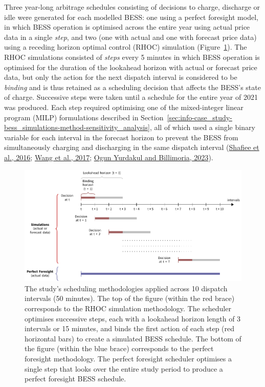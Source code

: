\documentclass[12pt,a4paper,]{report}
\begin{document}
Three year-long arbitrage schedules consisting of decisions to charge,
discharge or idle were generated for each modelled BESS: one using a
perfect foresight model, in which BESS operation is optimised across the
entire year using actual price data in a single \emph{step}, and two
(one with actual and one with forecast price data) using a receding
horizon optimal control (RHOC) simulation
(Figure~\ref{fig:bess_schedules}). The RHOC simulations consisted of
\emph{steps} every 5 minutes in which BESS operation is optimised for
the duration of the lookahead horizon with actual or forecast price
data, but only the action for the next dispatch interval is considered
to be \emph{binding} and is thus retained as a scheduling decision that
affects the BESS's state of charge. Successive steps were taken until a
schedule for the entire year of 2021 was produced. Each step required
optimising one of the mixed-integer linear program (MILP) formulations
described in
Section~\ref{sec:info-case_study-bess_simulations-method-sensitivity_analysis},
all of which used a single binary variable for each interval in the
forecast horizon to prevent the BESS from simultaneously charging and
discharging in the same dispatch interval
(\protect\hyperlink{ref-shafieeEconomicAssessmentPricemaker2016}{Shafiee
et al., 2016};
\protect\hyperlink{ref-wangOptimalSchedulingEnergy2017}{Wang et al.,
2017};
\protect\hyperlink{ref-yurdakulRiskAverseSelfSchedulingStorage2023}{Ogun
Yurdakul and Billimoria, 2023}).

\begin{figure}
\hypertarget{fig:bess_schedules}{%
\centering
\includegraphics{source/figures/storage_simulations.pdf}
\caption{The study's scheduling methodologies applied across 10 dispatch
intervals (50 minutes). The top of the figure (within the red brace)
corresponds to the RHOC simulation methodology. The scheduler optimises
successive steps, each with a lookahead horizon length of 3 intervals or
15 minutes, and binds the first action of each step (red horizontal
bars) to create a simulated BESS schedule. The bottom of the figure
(within the blue brace) corresponds to the perfect foresight
methodology. The perfect foresight scheduler optimises a single step
that looks over the entire study period to produce a perfect foresight
BESS schedule.}\label{fig:bess_schedules}
}
\end{figure}
\end{document}
